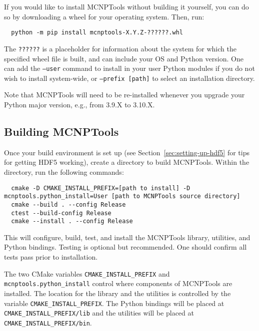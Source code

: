 \documentclass[11pt]{article}
\begin{document}
If you would like to install MCNPTools without building it yourself, you can do so by downloading a wheel for your operating system.
Then, run:
\begin{lstlisting}
  python -m pip install mcnptools-X.Y.Z-??????.whl
\end{lstlisting}
The \texttt{??????} is a placeholder for information about the system for which the specified wheel file is built, and can include your OS and Python version.
One can add the \texttt{--user} command to install in your user Python modules if you do not wish to install system-wide, or \texttt{--prefix [path]} to select an installation directory.

Note that MCNPTools will need to be re-installed whenever you upgrade your Python major version, e.g., from 3.9.X to 3.10.X.

\subsection{Building MCNPTools}\label{sec:building-mcnptools}

Once your build environment is set up (see Section~\ref{sec:setting-up-hdf5} for tips for getting HDF5 working), create a directory to build MCNPTools.
Within the directory, run the following commands:

\begin{lstlisting}
  cmake -D CMAKE_INSTALL_PREFIX=[path to install] -D mcnptools.python_install=User [path to MCNPTools source directory]
  cmake --build . --config Release
  ctest --build-config Release
  cmake --install . --config Release
\end{lstlisting}

This will configure, build, test, and install the MCNPTools library, utilities, and Python bindings.
Testing is optional but recommended.
One should confirm all tests pass prior to installation.

The two CMake variables \texttt{CMAKE\_INSTALL\_PREFIX} and \texttt{mcnptools.python\_install} control where components of MCNPTools are installed.
The location for the library and the utilities is controlled by the variable \texttt{CMAKE\_INSTALL\_PREFIX}.
The Python bindings will be placed at \texttt{CMAKE\_INSTALL\_PREFIX/lib} and the utilities will be placed at \texttt{CMAKE\_INSTALL\_PREFIX/bin}.
\end{document}
